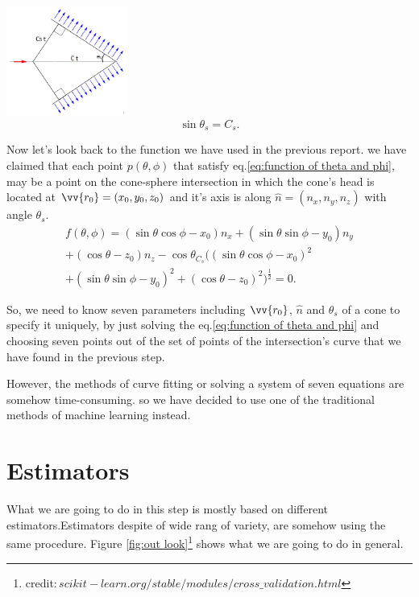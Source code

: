 \documentclass[a4paper,12pt]{article}
\begin{document}
\begin{multicols}{2}
\hspace{+1cm}\includegraphics[width=0.3\textwidth]{Screenshot (183).png}
\label{fig:cherenkov2}
\begin{equation}
    \sin{\theta_s} = C_s. \label{eq:eq1}
\end{equation}

Now let's look back to the function we have used in the previous report. we have claimed that each point $p(\theta,\phi)$ that satisfy eq.\eqref{eq:function of theta and phi}, may be a point on the cone-sphere intersection in which the cone's head is located at $\vv{r_0} = (x_0, y_0, z_0)$ and it's axis is along $\hat{n} = (n_x, n_y, n_z)$ with angle $\theta_s$.
\begin{multline}
       f(\theta,\phi) = (\sin{\theta} \cos{\phi} - x_0) n_x + (\sin{\theta} \sin{\phi}- y_0) n_y\\ + (\cos{\theta} - z_0) n_z - \cos{\theta_{C_s}} \bigg((\sin{\theta} \cos{\phi} - x_0)^2 \\ + ( \sin{\theta} \sin{\phi}- y_0)^2 + (\cos{\theta} - z_0)^2\bigg)^{\frac{1}{2}} = 0.
       \label{eq:function of theta and phi}
\end{multline}

So, we need to know seven parameters including $\vv{r_0}$, $\hat{n}$ and $\theta_s$ of a cone to specify it uniquely, by just solving the eq.\eqref{eq:function of theta and phi} and choosing seven points out of the set of points of the intersection's curve that we have found in the previous step. 

However, the methods of curve fitting or solving a system of seven equations are somehow time-consuming. so we have decided to use one of the traditional methods of machine learning instead.

\section{Estimators}
What we are going to do in this step is mostly based on different estimators.Estimators despite of wide rang of variety, are somehow using the same procedure. Figure \ref{fig:out look}\footnote{credit$:scikit-learn.org/stable/modules/cross\_validation.html$} shows what we are going to do in general.


\end{multicols}
\end{document}
